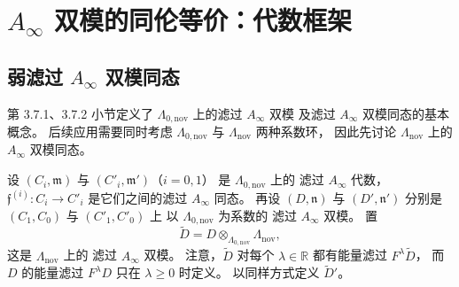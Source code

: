 
\section{\texorpdfstring{$A_\infty$}{A-infinity} 双模的同伦等价：代数框架}
\label{sec:5-2}

\subsection{弱滤过 \texorpdfstring{$A_\infty$}{A-infinity} 双模同态}
\label{subsec:5-2-1}

第 3.7.1、3.7.2 小节定义了
$\Lambda_{0,\mathrm{nov}}$ 上的滤过 $A_\infty$ 双模
及滤过 $A_\infty$ 双模同态的基本概念。
后续应用需要同时考虑
$\Lambda_{0,\mathrm{nov}}$
与 $\Lambda_{\mathrm{nov}}$ 两种系数环，
因此先讨论 $\Lambda_{\mathrm{nov}}$ 上的
$A_\infty$ 双模同态。

设 $(C_i,\mathfrak m)$ 与
$(C'_i,\mathfrak m')$（$i=0,1$）
是 $\Lambda_{0,\mathrm{nov}}$ 上的
滤过 $A_\infty$ 代数，
$\mathfrak f^{(i)}:C_i\to C'_i$
是它们之间的滤过 $A_\infty$ 同态。
再设 $(D,\mathfrak n)$ 与
$(D',\mathfrak n')$ 分别是
$(C_1,C_0)$ 与 $(C'_1,C'_0)$ 上
以 $\Lambda_{0,\mathrm{nov}}$ 为系数的
滤过 $A_\infty$ 双模。
置
\[
\widetilde D
=D\otimes_{\Lambda_{0,\mathrm{nov}}}
\Lambda_{\mathrm{nov}},
\]
这是 $\Lambda_{\mathrm{nov}}$ 上的
滤过 $A_\infty$ 双模。
注意，$\widetilde D$ 对每个
$\lambda\in\mathbb R$ 都有能量滤过
$F^\lambda\widetilde D$，
而 $D$ 的能量滤过 $F^\lambda D$
只在 $\lambda\geq0$ 时定义。
以同样方式定义 $\widetilde D'$。

